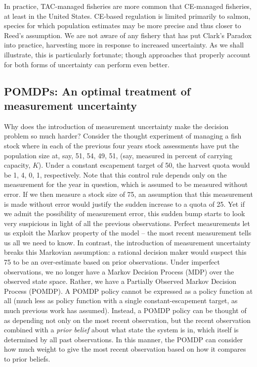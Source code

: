 \documentclass[3p]{elsarticle} %
\begin{document}
In practice, TAC-managed fisheries are more common that CE-managed
fisheries, at least in the United States. CE-based regulation is limited
primarily to salmon, species for which population estimates may be more
precise and thus closer to Reed's assumption. We are not aware of any
fishery that has put Clark's Paradox into practice, harvesting more in
response to increased uncertainty. As we shall illustrate, this is
particularly fortunate; though approaches that properly account for both
forms of uncertainty can perform even better.

\hypertarget{pomdps-an-optimal-treatment-of-measurement-uncertainty}{%
\subsection{POMDPs: An optimal treatment of measurement
uncertainty}\label{pomdps-an-optimal-treatment-of-measurement-uncertainty}}

Why does the introduction of measurement uncertainty make the decision
problem so much harder? Consider the thought experiment of managing a
fish stock where in each of the previous four years stock assessments
have put the population size at, say, 51, 54, 49, 51, (say, measured in
percent of carrying capacity, \(K\)). Under a constant escapement target
of 50, the harvest quota would be 1, 4, 0, 1, respectively. Note that
this control rule depends only on the measurement for the year in
question, which is assumed to be measured without error. If we then
measure a stock size of 75, an assumption that this measurement is made
without error would justify the sudden increase to a quota of 25. Yet if
we admit the possibility of measurement error, this sudden bump starts
to look very suspicious in light of all the previous observations.
Perfect measurements let us exploit the Markov property of the model --
the most recent measurement tells us all we need to know. In contrast,
the introduction of measurement uncertainty breaks this Markovian
assumption: a rational decision maker would suspect this 75 to be an
over-estimate based on prior observations. Under imperfect observations,
we no longer have a Markov Decision Process (MDP) over the observed
state space. Rather, we have a Partially Observed Markov Decision
Process (POMDP). A POMDP policy cannot be expressed as a policy function
at all (much less as policy function with a single constant-escapement
target, as much previous work has assumed). Instead, a POMDP policy can
be thought of as depending not only on the most recent observation, but
the recent observation combined with a \emph{prior belief} about what
state the system is in, which itself is determined by all past
observations. In this manner, the POMDP can consider how much weight to
give the most recent observation based on how it compares to prior
beliefs.
\end{document}
